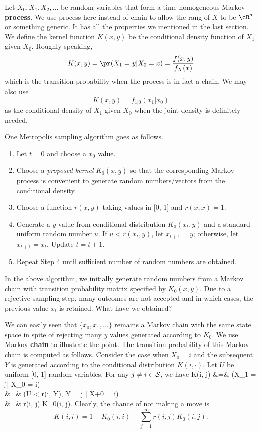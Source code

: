 Let $X_0, X_1, X_2, \ldots$ be random variables that form a
time-homogeneous Markov {\bf process}. 
We use process here instead of chain to allow the
rang of $X$ to be $\cR^d$ or something generic.
It has all the properties we mentioned in the last section.
We define the kernel function $K(x, y)$ be the conditional
density function of $X_1$ given $X_0$. Roughly speaking,
\[
K(x, y) = \pr(X_1 = y| X_0 =x) = \frac{f(x, y)}{f_X(x)}
\]
which is the transition probability when the process is in fact
a chain. We may also use
\[
K(x, y) = f_{1|0}(x_1 | x_0)
\]
as the conditional density of $X_1$ given $X_0$
when the joint density is definitely needed.

One Metropolis sampling algorithm goes as follows.
\begin{enumerate}
\item
Let $t = 0$ and choose a $x_0$ value.

\item
Choose a {\it proposed kernel} $K_0(x, y)$ so that the corresponding
Markov process is convenient to generate random numbers/vectors
from the conditional density.

\item
Choose a function $r(x, y)$ taking values in [0, 1] and $r(x, x) = 1$.

\item
Generate a $y$ value from conditional distribution $K_0(x_{t}, y)$
and a standard uniform random number $u$. 
If $u < r(x_t, y)$, let $x_{t+1} = y$;
otherwise, let $x_{t+1} = x_t$. Update $t = t+1$.

\item
Repeat Step 4 until sufficient number of random numbers
are obtained.
\end{enumerate}

In the above algorithm, we initially generate
random numbers from a Markov chain with transition
probability matrix specified by $K_0(x, y)$. Due to
a rejective sampling step, many outcomes are
not accepted and in which cases, the previous value $x_t$ is retained.
What have we obtained?

We can easily seen that $\{x_0, x_1, \ldots \}$
remains a Markov chain with the same state space
in spite of rejecting many $y$ values generated according to 
$K_0$. We use Markov {\bf chain} to illustrate the point.
The transition probability of this Markov chain is computed as follows.
Consider the case when $X_0 = i$ and the
subsequent $Y$ is generated according to the conditional distribution 
$K(i, \cdot)$.
Let $U$ be \iid uniform [0, 1] random variables.
For any $j \neq i \in{\cal S}$, we have
\ba
K(i, j) 
&=& \pr(X_1 = j| X_0 = i) \\
&=&
\pr(U < r(i, Y), Y = j | X+0 = i) \\
&=&
r(i, j) K_0(i, j).
\ea
Clearly, the chance of not making a move is
\[
K(i, i) = 1 + K_0(i, i)  - \sum_{j=1}^\infty r(i, j) K_0(i, j).
\]

